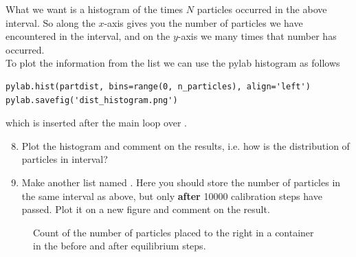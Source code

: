 \documentclass{article}
\begin{document}
What we want is a histogram of the times $N$ particles occurred in the above
interval. So along the $x$-axis gives you the number of particles we have
encountered in the interval, and on the $y$-axis we many times that number
has occurred.\\

To plot the information from the list we can use the pylab histogram as follows

\begin{lstlisting}
pylab.hist(partdist, bins=range(0, n_particles), align='left')
pylab.savefig('dist_histogram.png')
\end{lstlisting}

which is inserted after the main loop over .

\begin{enumerate}
  \setcounter{enumi}{7}
  \item Plot the histogram and comment on the results, i.e. how is the
    distribution of particles in interval?

  \item Make another list named . Here you should store the
    number of particles in the same interval as above, but only {\bf after}
    10000 calibration steps have passed. Plot it on a new figure and comment
    on the result.

\end{enumerate}

\begin{figure}[htb]
  \label{fig:partdist}
  \caption{
     Count of the number of particles placed to the right in a container in the
     before and after equilibrium steps.
  }
\end{figure}



\end{document}
